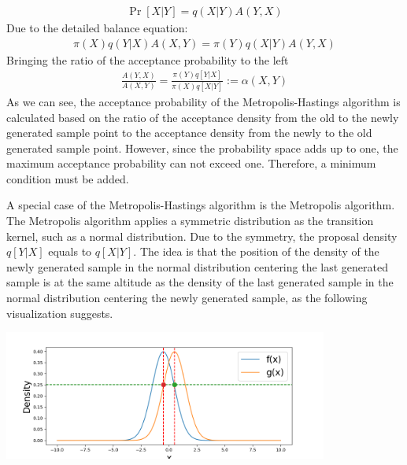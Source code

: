 \begin{align}
\Pr[X|Y] = q(X|Y) A(Y, X)
\end{align}
Due to the detailed balance equation:\cite{mcmc_practice}
\begin{align}
\pi(X) q(Y|X) A(X, Y) = \pi(Y) q(X|Y) A(Y, X)
\end{align}
Bringing the ratio of the acceptance probability to the left
\begin{align}
\frac{A(Y, X)}{A(X, Y)} = \frac{\pi(Y)q[Y|X]}{\pi(X)q[X|Y]} := \alpha(X, Y)
\end{align} 
As we can see, the acceptance probability of the Metropolis-Hastings algorithm is calculated based on the ratio of the acceptance density from the old to the newly generated sample point to the acceptance density from the newly to the old generated sample point. However, since the probability space adds up to one, the maximum acceptance probability can not exceed one. Therefore, a minimum condition must be added.

A special case of the Metropolis-Hastings algorithm is the Metropolis algorithm. The Metropolis algorithm applies a symmetric distribution as the transition kernel, such as a normal distribution.\cite{metropolis} Due to the symmetry, the proposal density $q[Y|X]$ equals to $q[X|Y]$. The idea is that the position of the density of the newly generated sample in the normal distribution centering the last generated sample is at the same altitude as the density of the last generated sample in the normal distribution centering the newly generated sample, as the following visualization suggests. 
\begin{center}
\includegraphics[width=0.8\textwidth]{figures/mcmc_example/proof.png}
\end{center}

